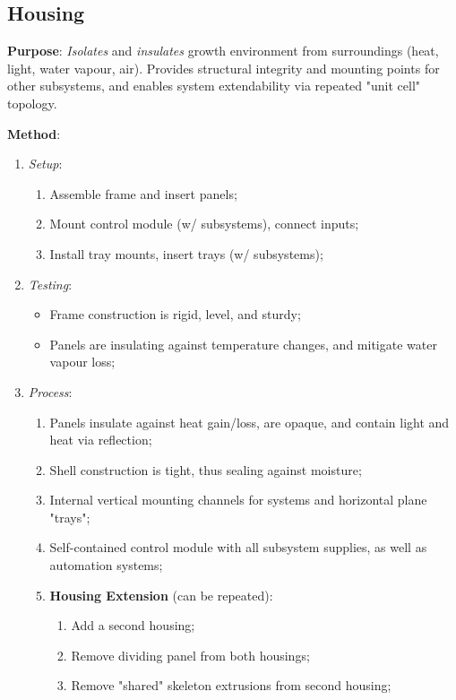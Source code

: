 \subsection{Housing}
\label{sec:housing}

\textbf{Purpose}: \textit{Isolates} and \textit{insulates} growth environment from surroundings (heat, light, water vapour, air). Provides structural integrity and mounting points for other subsystems, and enables system extendability via repeated "unit cell" topology.

\textbf{Method}:
\begin{enumerate}
    \item \textit{Setup}:
    \begin{enumerate}
        \item Assemble frame and insert panels;
        \item Mount control module (w/ subsystems), connect inputs;
        \item Install tray mounts, insert trays (w/ subsystems);
    \end{enumerate}
    \item \textit{Testing}:
    \begin{itemize}
        \item Frame construction is rigid, level, and sturdy;
        \item Panels are insulating against temperature changes, and mitigate water vapour loss;
    \end{itemize}
    \item \textit{Process}:
    \begin{enumerate}
        \item Panels insulate against heat gain/loss, are opaque, and contain light and heat via reflection;
        \item Shell construction is tight, thus sealing against moisture;
        \item Internal vertical mounting channels for systems and horizontal plane "trays";
        \item Self-contained control module with all subsystem supplies, as well as automation systems;
        \item \textbf{Housing Extension} (can be repeated):
        \begin{enumerate}
            \item Add a second housing;
            \item Remove dividing panel from both housings;
            \item Remove "shared" skeleton extrusions from second housing;

\end{enumerate}
\end{enumerate}
\end{enumerate}

